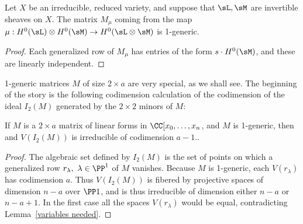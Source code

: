%

\begin{proposition}\label{some generators}
Let $X$ be
an irreducible, reduced variety, and suppose that $\sL,\sM$ are invertible sheaves on $X$.
The matrix $M_\mu$ coming from the map $\mu:H^0(\sL) \otimes H^0(\sM) \to H^0(\sL\otimes \sM)$
is 1-generic.
\end{proposition}

\begin{proof} Each generalized row of $M_\mu$ has entries of the form $s\cdot H^0(\sM)$,
and these are linearly independent.
\end{proof}

1-generic matrices $M$ of size $2\times a$ are very special, as we shall see. The beginning of the story is the following
codimension calculation of the codimension of the ideal $I_2(M)$ generated by the $2\times 2$ minors of $M$:

\begin{lemma}\label{codim of 2,n 1-generic}
If $M$ is a $2\times a$ matrix of linear forms in $\CC[x_0,\dots, x_n$, and $M$ is 1-generic, then 
and $V(I_2(M))$ is irreducible of codimension $a-1$..
\end{lemma}

\begin{proof}
The algebraic set defined by $I_2(M)$ is the set of points on which a generalized row $r_\lambda, \ \lambda\in \PP^1$ of $M$ vanishes.
Because $M$ is 1-generic, each $V(r_\lambda)$ has codimension $a$. Thus $V(I_2(M))$ is fibered by projective
spaces of dimension $n-a$ over $\PP1$, and is thus irreducible of dimension either $n-a$ or $n-a+1$. In the first
case all the spaces $V(r_\lambda)$  would be equal, contradicting Lemma~\ref{variables needed}.
\end{proof}



